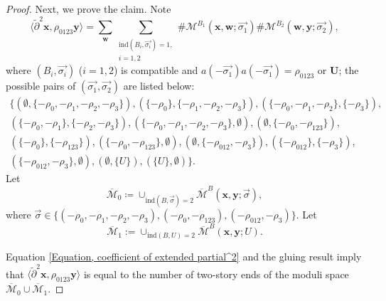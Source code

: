 \documentclass[10pt,a4paper]{amsart}
\begin{document}
\begin{proof}
Next, we prove the claim. Note
\begin{equation}\label{Equation, coefficient of extended partial^2}
\langle\tilde{\partial}^2\bm{x}, \rho_{0123}\bm{y}\rangle=\sum_{\bm{w}}\sum_{\substack{\text{ind}(B_i,\overrightarrow{\sigma_i})=1,\\ i=1,2}} \#\mathcal{M}^{B_1}(\bm{x},\bm{w};\overrightarrow{\sigma_1})\#\mathcal{M}^{B_2}(\bm{w},\bm{y};\overrightarrow{\sigma_2}),
\end{equation}
where $(B_i,\overrightarrow{\sigma_i})$ ($i=1,2$) is compatible and $a(-\overrightarrow{\sigma_1})a(-\overrightarrow{\sigma_1})=\rho_{0123}$ or $\bm{U}$; the possible pairs of $(\overrightarrow{\sigma_1},\overrightarrow{\sigma_2})$ are listed below:
\begin{align*}
\bigg\{(\emptyset,\{-\rho_0,-\rho_1,-\rho_2,-\rho_3\}),(\{-\rho_0\},\{-\rho_1,-\rho_2,-\rho_3\}),(\{-\rho_0,-\rho_1,-\rho_2\},\{-\rho_3\}),\\
(\{-\rho_0,-\rho_1\},\{-\rho_2,-\rho_3\}),(\{-\rho_0,-\rho_1,-\rho_2,-\rho_3\},\emptyset),(\emptyset,\{-\rho_0,-\rho_{123}\}),\\(\{-\rho_0\},\{-\rho_{123}\}),(\{-\rho_0,-\rho_{123}\},\emptyset),(\emptyset,\{-\rho_{012},-\rho_{3}\}),(\{-\rho_{012}\},\{-\rho_{3}\}),\\(\{-\rho_{012},-\rho_{3}\},\emptyset),(\emptyset,\{U\}),(\{U\},\emptyset)\bigg\}.
\end{align*}
Let $$\overline{\mathcal{M}}_0\coloneqq\cup_{\text{ind}(B,\overrightarrow{\sigma})=2}\overline{\mathcal{M}}^B(\bm{x},\bm{y};\overrightarrow{\sigma}),$$ where $\overrightarrow{\sigma}\in \{(-\rho_0,-\rho_1,-\rho_2,-\rho_3),(-\rho_0,-\rho_{123}),(-\rho_{012},-\rho_{3})\}$. Let $$\overline{\mathcal{M}}_1:=\cup_{\text{ind}(B,U)=2}\overline{\mathcal{M}}^B(\bm{x},\bm{y};U).$$

Equation \ref{Equation, coefficient of extended partial^2} and the gluing result imply that $\langle\tilde{\partial}^2\bm{x}, \rho_{0123}\bm{y}\rangle$ is equal to the number of two-story ends of the moduli space $\overline{\mathcal{M}}_0\cup \overline{\mathcal{M}}_1$. 


\end{proof}
\end{document}
